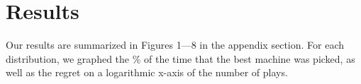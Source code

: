 
\section{Results}
\label{sec:results}

Our results are summarized in Figures 1---8 in the appendix
section. For each distribution, we graphed the \% of the time that the
best machine was picked, as well as the regret on a logarithmic x-axis
of the number of plays.

